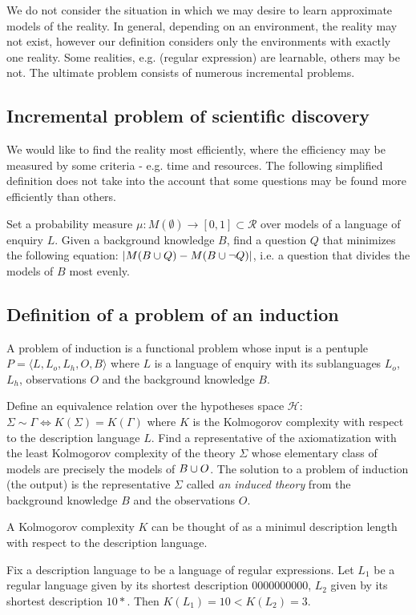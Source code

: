 We do not consider the situation in which we may desire to learn approximate models of the reality. In general, depending on an environment, the reality may not exist, however our definition considers only the environments with exactly one reality. Some realities, e.g. (regular expression) are learnable, others may be not. The ultimate problem consists of numerous incremental problems.

\subsection{Incremental problem of scientific discovery}
We would like to find the reality most efficiently, where the efficiency may be measured by some criteria - e.g. time and resources. The following simplified definition does not take into the account that some questions may be found more efficiently than others.

Set a probability measure $\mu:M(\emptyset) \to [0,1] \subset \mathcal{R}$ over models of a language of enquiry $L$. Given a background knowledge $B$, find a question $Q$ that minimizes the following equation: $|M(B \cup {Q})-M(B \cup {\neg Q})|$, i.e. a question that divides the models of $B$ most evenly.

\subsection{Definition of a problem of an induction}
A problem of induction is a functional problem whose input is a pentuple $P=\langle L, L_o, L_h, O, B\rangle$ where $L$ is a language of enquiry with its sublanguages $L_o$, $L_h$, observations $O$ and the background knowledge $B$.

Define an equivalence relation over the hypotheses space $\mathcal{H}$: $\Sigma \sim \Gamma \iff K(\Sigma)=K(\Gamma)$ where $K$ is the Kolmogorov complexity with respect to the description language $L$. Find a representative of the axiomatization with the least Kolmogorov complexity of the theory $\Sigma$ whose elementary class of models are precisely the models of $B \cup O$. The solution  to a problem of induction (the output) is the representative $\Sigma$ called \emph{an induced theory} from the background knowledge $B$ and the observations $O$.

\begin{note}
A Kolmogorov complexity $K$ can be thought of as a minimul description length with respect to the description language.
\end{note}
\begin{exmp}
Fix a description language to be a language of regular expressions. Let $L_1$ be a regular language given by its shortest description $0000000000$, $L_2$ given by its shortest description $10*$. Then $K(L_1)=10<K(L_2)=3$.
\end{exmp}

